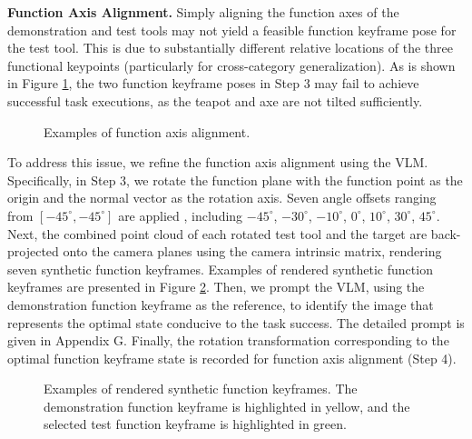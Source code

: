 \noindent \textbf{Function Axis Alignment.} Simply aligning the function axes of the demonstration and test tools may not yield a feasible function keyframe pose for the test tool. This is due to substantially different relative locations of the three functional keypoints (particularly for cross-category generalization). As is shown in Figure \ref{fig:axis_example}, the two function keyframe poses in Step 3 may fail to achieve successful task executions, as the teapot and axe are not tilted sufficiently.

\begin{figure}[h]
  \centering
    \vspace*{-0.1in}
  \caption{Examples of function axis alignment.}
  \label{fig:axis_example}
\end{figure}


\noindent To address this issue, we refine the function axis alignment using the VLM. Specifically, in Step 3, we rotate the function plane with the function point as the origin and the normal vector as the rotation axis. Seven angle offsets ranging from $[-45^{\circ}, -45^{\circ}]$ are applied , including $-45^{\circ}$, $-30^{\circ}$, $-10^{\circ}$, $0^{\circ}$, $10^{\circ}$, $30^{\circ}$, $45^{\circ}$. Next, the combined point cloud of each rotated test tool and the target are back-projected onto the camera planes using the camera intrinsic matrix, rendering seven synthetic 
function keyframes. Examples of rendered synthetic function keyframes are presented in Figure \ref{fig:axis_render}. Then, we prompt the VLM, using the demonstration function keyframe as the reference, to  identify the image that represents the optimal state conducive to the task success. The detailed prompt is given in Appendix G. Finally, the rotation transformation corresponding to the optimal function keyframe state is recorded for function axis alignment (Step 4). 

\begin{figure}[h]
  \centering
  \caption{Examples of rendered synthetic function keyframes. The demonstration function keyframe is highlighted in yellow, and the selected test function keyframe is highlighted in green.}
  \label{fig:axis_render}
\end{figure}

